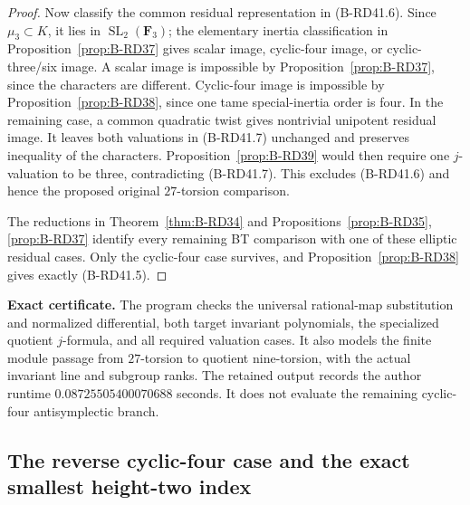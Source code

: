 \begin{proof}
Now classify the common residual representation in (B-RD41.6).
Since $\mu_3\subset K$, it lies in
$\operatorname{SL}_2(\mathbf F_3)$; the elementary inertia
classification in Proposition~\ref{prop:B-RD37} gives scalar image,
cyclic-four image, or cyclic-three/six image. A scalar image is
impossible by Proposition~\ref{prop:B-RD37}, since the characters
are different. Cyclic-four image is impossible by
Proposition~\ref{prop:B-RD38}, since one tame special-inertia order
is four. In the remaining case, a common quadratic twist gives
nontrivial unipotent residual image. It leaves both valuations in
(B-RD41.7) unchanged and preserves inequality of the characters.
Proposition~\ref{prop:B-RD39} would then require one $j$-valuation
to be three, contradicting (B-RD41.7). This excludes (B-RD41.6)
and hence the proposed original $27$-torsion comparison.

The reductions in Theorem~\ref{thm:B-RD34} and
Propositions~\ref{prop:B-RD35}, \ref{prop:B-RD37} identify every
remaining BT comparison with one of these elliptic residual cases.
Only the cyclic-four case survives, and
Proposition~\ref{prop:B-RD38} gives exactly (B-RD41.5).
\end{proof}

\par\smallskip\noindent\textbf{Exact certificate.}
The program  checks the
universal rational-map substitution and normalized differential,
both target invariant polynomials, the specialized quotient
$j$-formula, and all required valuation cases. It also models the
finite module passage from $27$-torsion to quotient nine-torsion,
with the actual invariant line and subgroup ranks. The retained
output records the author runtime $0.08725505400070688$ seconds.
It does not evaluate the remaining
cyclic-four antisymplectic branch.


\subsection{The reverse cyclic-four case and the exact smallest height-two index}

